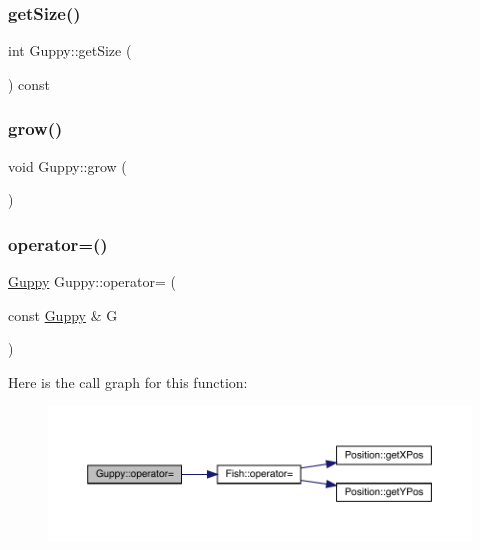 \mbox{\label{class_guppy_a38fa7d69e65a6778e1cdf6a0b542f295}} 
\subsubsection{\texorpdfstring{get\+Size()}{getSize()}}
{\footnotesize\ttfamily int Guppy\+::get\+Size (\begin{DoxyParamCaption}{ }\end{DoxyParamCaption}) const}

\mbox{\label{class_guppy_a342d7b7c5a5c456b2acfa03a8e24494e}} 
\subsubsection{\texorpdfstring{grow()}{grow()}}
{\footnotesize\ttfamily void Guppy\+::grow (\begin{DoxyParamCaption}{ }\end{DoxyParamCaption})}

\mbox{\label{class_guppy_aa30f6db726124f670123daadb53a581f}} 
\subsubsection{\texorpdfstring{operator=()}{operator=()}}
{\footnotesize\ttfamily \mbox{\hyperlink{class_guppy}{Guppy}} Guppy\+::operator= (\begin{DoxyParamCaption}\item[{const \mbox{\hyperlink{class_guppy}{Guppy}} \&}]{G }\end{DoxyParamCaption})}

Here is the call graph for this function\+:
\nopagebreak
\begin{figure}[H]
\begin{center}
\leavevmode
\includegraphics[width=350pt]{class_guppy_aa30f6db726124f670123daadb53a581f_cgraph}
\end{center}
\end{figure}
\mbox{\label{class_guppy_a95cab69dac975dcdf44f0fdc698764e1}} 
